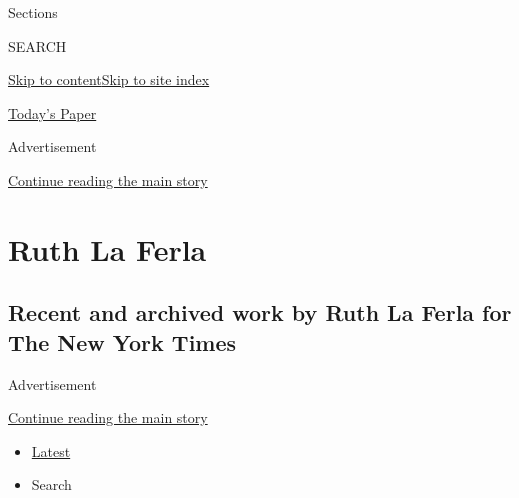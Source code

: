 Sections

SEARCH

\protect\hyperlink{site-content}{Skip to
content}\protect\hyperlink{site-index}{Skip to site index}

\href{https://myaccount.nytimes3xbfgragh.onion/auth/login?response_type=cookie\&client_id=vi}{}

\href{https://www.nytimes3xbfgragh.onion/section/todayspaper}{Today's
Paper}

Advertisement

\protect\hyperlink{after-top}{Continue reading the main story}

\hypertarget{ruth-la-ferla}{%
\section{Ruth La Ferla}\label{ruth-la-ferla}}

\hypertarget{recent-and-archived-work-by-ruth-la-ferla-for-the-new-york-times}{%
\subsection{Recent and archived work by Ruth La Ferla for The New York
Times}\label{recent-and-archived-work-by-ruth-la-ferla-for-the-new-york-times}}

Advertisement

\protect\hyperlink{after-mid1}{Continue reading the main story}

\begin{itemize}
\tightlist
\item
  \protect\hyperlink{stream-panel}{Latest}
\item
  Search
\end{itemize}

